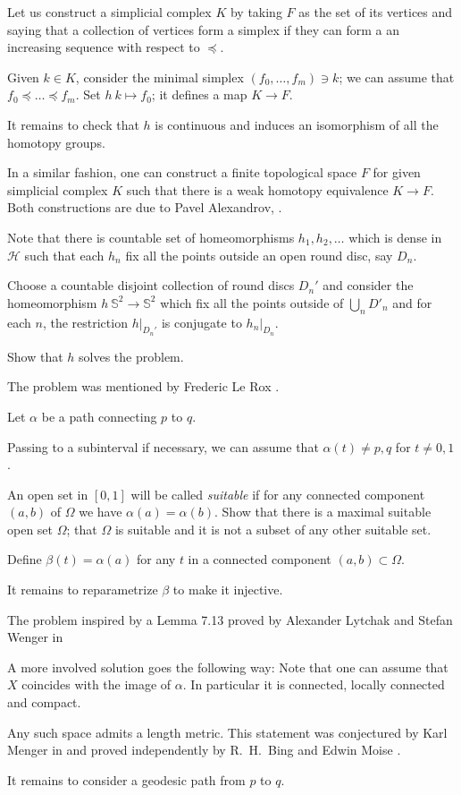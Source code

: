 Let us construct a simplicial complex $K$ 
by taking $F$ as the set of its vertices
and saying that a collection of vertices form a simplex 
if they can form a an increasing sequence with respect to $\preccurlyeq$.

Given $k\in K$,
consider the minimal simplex $(f_0,\dots,f_m)\ni k$;
we can assume that $f_0\preccurlyeq \dots\preccurlyeq f_m$.
Set $h\:k\mapsto f_0$;
it defines a map $K\to F$.

It remains to check that $h$ is continuous 
and induces an isomorphism of all the homotopy groups.
\qeds

In a similar fashion, one can construct a finite topological space $F$ for given simplicial complex $K$ 
such that 
there is a weak homotopy equivalence $K\to F$.
Both constructions are due to Pavel Alexandrov, 
\cite[see][]{alexandrov-finite,mccord}.

Note that there is countable set of homeomorphisms $h_1,h_2,\dots$ which is dense in $\mathcal{H}$
such that
each $h_n$ fix all the points outside an open round disc, say $D_n$.

Choose a countable disjoint collection of round discs $D_n'$
and consider the homeomorphism $h\:\mathbb S^2\to \mathbb S^2$
which fix all the points outside of $\bigcup_nD'_n$ and
for each $n$,
the restriction $h|_{D_n'}$ is conjugate to $h_n|_{D_n}$. 

Show that $h$ solves the problem.
\qeds

The problem was mentioned by Frederic Le Rox \cite[see][]{rox}.

Let $\alpha$ be a path connecting $p$ to $q$.

Passing to a subinterval if necessary,
we can assume that $\alpha(t)\ne p,q$ for $t\ne0,1$.

An open set in $[0,1]$ will be called {}\emph{suitable}
if for any connected component $(a,b)$ of $\Omega$ we have $\alpha(a)=\alpha(b)$.
Show that there is a maximal suitable open set $\Omega$;
that $\Omega$ is suitable and it is not a subset of any other suitable set.

Define $\beta(t)=\alpha(a)$ for any $t$ in a connected component $(a,b)\subset\Omega$.

It remains to reparametrize $\beta$ to make it injective.
\qeds

The problem inspired by a Lemma 7.13 
proved by 
Alexander Lytchak
and Stefan Wenger in \cite{lytchak-wenger}

A more involved solution goes the following way:
Note that one can assume that $X$ coincides with the image of $\alpha$.
In particular it is connected, locally connected and compact.

Any such space admits a length metric.
This statement was conjectured by Karl Menger in \cite{menger}
and proved independently 
by R.~H.~Bing  \cite[see][]{bing-length-0, bing-length-1} 
and Edwin Moise \cite[see][]{moise}.

It remains to consider a geodesic path from $p$ to $q$.